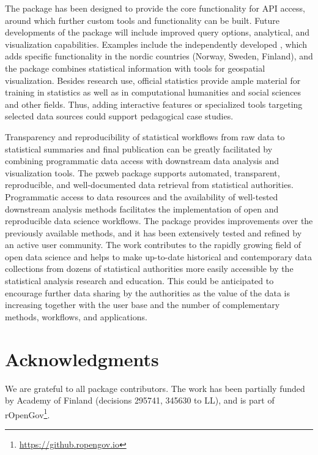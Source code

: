 The  package has been designed to provide the core
functionality for API access, around which further custom tools and
functionality can be built. Future developments of the package will
include improved query options, analytical, and visualization
capabilities. Examples include the independently
developed , which adds specific functionality in
the nordic countries (Norway, Sweden, Finland), and the
 package combines statistical information with tools for
geospatial visualization. Besides research use, official statistics
provide ample material for training in statistics as well as in
computational humanities and social sciences and other fields. Thus,
adding interactive features or specialized tools targeting selected
data sources could support pedagogical case studies.


Transparency and reproducibility of statistical workflows from raw
data to statistical summaries and final publication can be greatly
facilitated by combining programmatic data access with downstream data
analysis and visualization tools. The pxweb package supports
automated, transparent, reproducible, and well-documented data
retrieval from statistical authorities. Programmatic access to data
resources and the availability of well-tested downstream analysis
methods facilitates the implementation of open and reproducible data
science workflows. The  package provides improvements
over the previously available methods, and it has been extensively
tested and refined by an active user community. The work contributes
to the rapidly growing field of open data science \cite{Lahti2018IDA,
xxx} and helps to make up-to-date historical and contemporary data
collections from dozens of statistical authorities more easily
accessible by the statistical analysis research and education. This
could be anticipated to encourage further data sharing by the
authorities as the value of the data is increasing together with the
user base and the number of complementary methods, workflows, and
applications.



\section*{Acknowledgments}

We are grateful to all package contributors. The work has been
partially funded by Academy of Finland (decisions 295741, 345630 to
LL), and is part of
rOpenGov\footnote{\url{https://github.ropengov.io}}.


